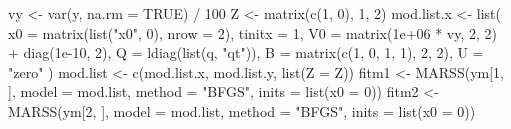 \begin{Schunk}
\begin{Sinput}
 vy <- var(y, na.rm = TRUE) / 100
 Z <- matrix(c(1, 0), 1, 2)
 mod.list.x <- list(
   x0 = matrix(list("x0", 0), nrow = 2), tinitx = 1,
   V0 = matrix(1e+06 * vy, 2, 2) + diag(1e-10, 2),
   Q = ldiag(list(q, "qt")),
   B = matrix(c(1, 0, 1, 1), 2, 2),
   U = "zero"
 )
 mod.list <- c(mod.list.x, mod.list.y, list(Z = Z))
 fitm1 <- MARSS(ym[1, ], model = mod.list, method = "BFGS", inits = list(x0 = 0))
 fitm2 <- MARSS(ym[2, ], model = mod.list, method = "BFGS", inits = list(x0 = 0))
\end{Sinput}
\end{Schunk}
